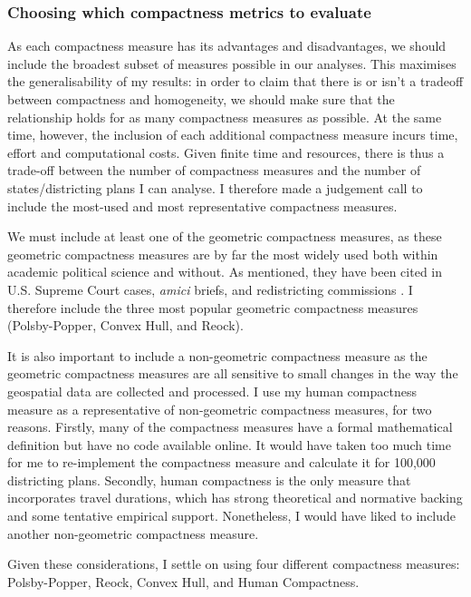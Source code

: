 \documentclass[]{article}
\begin{document}
\hypertarget{choosing-which-compactness-metrics-to-evaluate}{%
\subsubsection{Choosing which compactness metrics to
evaluate}\label{choosing-which-compactness-metrics-to-evaluate}}

As each compactness measure has its advantages and disadvantages, we
should include the broadest subset of measures possible in our analyses.
This maximises the generalisability of my results: in order to claim
that there is or isn't a tradeoff between compactness and homogeneity,
we should make sure that the relationship holds for as many compactness
measures as possible. At the same time, however, the inclusion of each
additional compactness measure incurs time, effort and computational
costs. Given finite time and resources, there is thus a trade-off
between the number of compactness measures and the number of
states/districting plans I can analyse. I therefore made a judgement
call to include the most-used and most representative compactness
measures.

We must include at least one of the geometric compactness measures, as
these geometric compactness measures are by far the most widely used
both within academic political science and without. As mentioned, they
have been cited in U.S. Supreme Court cases, \emph{amici} briefs, and
redistricting commissions \citep{moncrief2011}. I therefore include the
three most popular geometric compactness measures (Polsby-Popper, Convex
Hull, and Reock).

It is also important to include a non-geometric compactness measure as
the geometric compactness measures are all sensitive to small changes in
the way the geospatial data are collected and processed. I use my human
compactness measure as a representative of non-geometric compactness
measures, for two reasons. Firstly, many of the compactness measures
have a formal mathematical definition but have no code available online.
It would have taken too much time for me to re-implement the compactness
measure and calculate it for 100,000 districting plans. Secondly, human
compactness is the only measure that incorporates travel durations,
which has strong theoretical and normative backing and some tentative
empirical support. Nonetheless, I would have liked to include another
non-geometric compactness measure.

Given these considerations, I settle on using four different compactness
measures: Polsby-Popper, Reock, Convex Hull, and Human Compactness.
\end{document}
